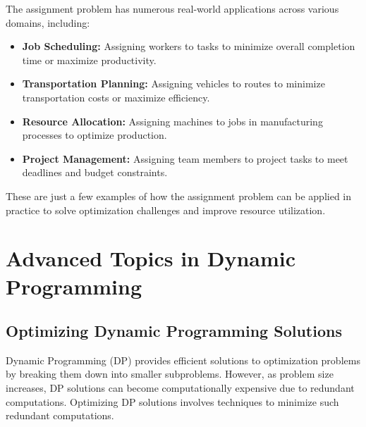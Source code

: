 \documentclass[12pt]{book} %
\begin{document}
The assignment problem has numerous real-world applications across various domains, including:
\begin{itemize}
    \item  \textbf{Job Scheduling:} Assigning workers to tasks to minimize overall completion time or maximize productivity.
\item \textbf{Transportation Planning:} Assigning vehicles to routes to minimize transportation costs or maximize efficiency.
\item \textbf{Resource Allocation:} Assigning machines to jobs in manufacturing processes to optimize production.
\item \textbf{Project Management:} Assigning team members to project tasks to meet deadlines and budget constraints.
\end{itemize}

These are just a few examples of how the assignment problem can be applied in practice to solve optimization challenges and improve resource utilization.

\section{Advanced Topics in Dynamic Programming}

\subsection{Optimizing Dynamic Programming Solutions}

Dynamic Programming (DP) provides efficient solutions to optimization problems by breaking them down into smaller subproblems. However, as problem size increases, DP solutions can become computationally expensive due to redundant computations. Optimizing DP solutions involves techniques to minimize such redundant computations.
\end{document}
